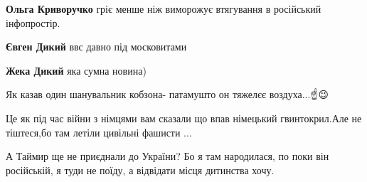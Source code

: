 \begin{itemize}
\begin{itemize}
\begin{itemize}
\textbf{Ольга Криворучко} гріє менше ніж виморожує втягування в російський інфопростір.
\end{itemize}

 
\textbf{Євген Дикий} ввс давно під московитами

 
\textbf{Жека Дикий} яка сумна новина)

\end{itemize}

 
Як казав один шанувальник кобзона- патамушто он тяжелєє воздуха...☝😉

 
Це як під час війни з німцями вам сказали що впав німецький гвинтокрил.Але не тіштеся,бо там летіли цивільні фашисти ...

 
А Таймир ще не приєднали до України? Бо я там народилася, по поки він російській, я туди не поїду, а відвідати місця дитинства хочу.

\begin{itemize}
 

\end{itemize}
\end{itemize}
